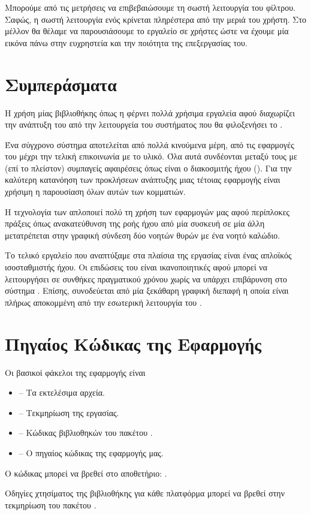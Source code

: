 \documentclass[12pt]{extarticle}
\begin{document}
Μπορούμε από τις μετρήσεις να επιβεβαιώσουμε τη σωστή λειτουργία του φίλτρου. Σαφώς, η σωστή 
λειτουργία ενός  κρίνεται πληρέστερα από την μεριά του χρήστη. Στο μέλλον
θα θέλαμε να παρουσιάσουμε το εργαλείο σε χρήστες ώστε να έχουμε μία εικόνα πάνω 
στην ευχρηστεία και την ποιότητα της επεξεργασίας του.

\section{Συμπεράσματα}

Η χρήση μίας βιβλιοθήκης όπως η  φέρνει πολλά χρήσιμα εργαλεία 
αφού διαχωρίζει την ανάπτυξη του  από την λειτουργεία του συστήματος που 
θα φιλοξενήσει το . 

Ένα σύγχρονο σύστημα αποτελείται από πολλά κινούμενα μέρη, από τις εφαρμογές 
του μέχρι την τελική επικοινωνία με το υλικό. Όλα αυτά συνδέονται μεταξύ τους
με (επί το πλείστον) συμπαγείς αφαιρέσεις όπως είναι ο διακοσμιτής ήχου ().
Για την καλύτερη κατανόηση των προκλήσεων ανάπτυξης μιας τέτοιας εφαρμογής είναι χρήσιμη  η
παρουσίαση όλων αυτών των κομματιών.

Η τεχνολογία των  απλοποιεί πολύ 
τη χρήση των εφαρμογών μας αφού περίπλοκες πράξεις όπως ανακατεύθυνση της 
ροής ήχου από μία συσκευή σε μία άλλη μετατρέπεται στην γραφική σύνδεση
δύο νοητών θυρών με ένα νοητό καλώδιο.

Το τελικό εργαλείο που αναπτύξαμε στα πλαίσια της εργασίας είναι ένας απλοϊκός ισοσταθμιστής
ήχου. Οι επιδώσεις του είναι ικανοποιητικές αφού μπορεί να λειτουργήσει σε συνθήκες πραγματικού 
χρόνου χωρίς να υπάρχει επιβάρυνση στο σύστημα . Επίσης, συνοδεύεται 
από μία ξεκάθαρη γραφική διεπαφή η οποία είναι πλήρως αποκομμένη από την εσωτερική λειτουργία
του .

\newpage



\appendix

\section{Πηγαίος Κώδικας της Εφαρμογής}

Οι βασικοί φάκελοι της εφαρμογής είναι

\begin{itemize}
    \item {} -- Τα εκτελέσιμα αρχεία.
    \item {} -- Τεκμηρίωση της εργασίας.
    \item {} -- Κώδικας βιβλιοθηκών του πακέτου .
    \item {} -- Ο πηγαίος κώδικας της εφαρμογής μας.
\end{itemize}

Ο κώδικας μπορεί να βρεθεί στο αποθετήριο: .

Οδηγίες χτησίματος της βιβλιοθήκης για κάθε πλατφόρμα μπορεί να βρεθεί στην τεκμηρίωση του πακέτου .
\end{document}
